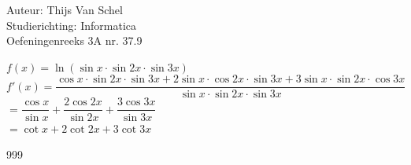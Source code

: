 \documentclass[a4paper]{article}
\begin{document}
  
\noindent \large Auteur: Thijs Van Schel \\
\noindent \large Studierichting: Informatica\\
\noindent \large Oefeningenreeks 3A nr. 37.9\\

\medskip

\normalsize

$f(x) = \ln(\sin x \cdot \sin 2x \cdot \sin 3x)$\\

$f'(x) = \dfrac{\cos x \cdot \sin 2x \cdot \sin 3x + 2\sin x \cdot \cos 2x \cdot \sin 3x + 3 \sin x \cdot \sin 2x \cdot \cos 3x}{\sin x \cdot \sin 2x \cdot \sin 3x}$\\

$= \dfrac{\cos x}{\sin x} + \dfrac{2\cos 2x}{\sin 2x} + \dfrac{3\cos 3x}{\sin 3x}$\\

$= \cot x + 2\cot 2x + 3\cot 3x$

\begin{thebibliography}{999}
\end{thebibliography}
\end{document}
